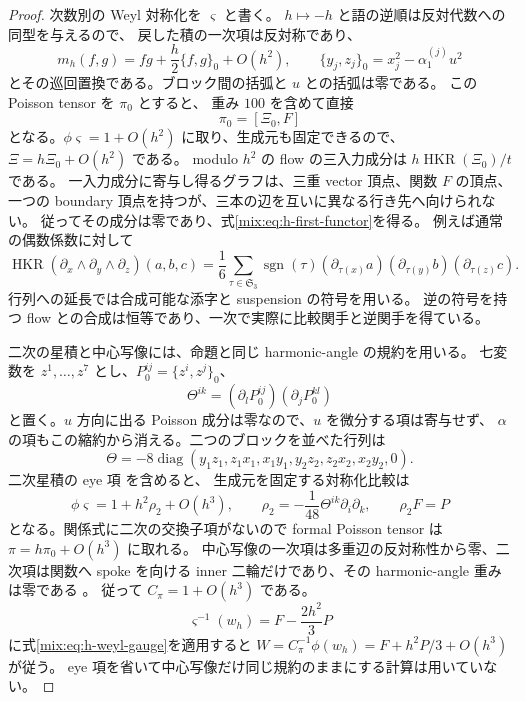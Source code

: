 \begin{proof}
次数別の Weyl 対称化を $\varsigma$ と書く。
$h\mapsto-h$ と語の逆順は反対代数への同型を与えるので、
戻した積の一次項は反対称であり、
\[
 m_h(f,g)=fg+\frac h2\{f,g\}_0+O(h^2),\qquad
 \{y_j,z_j\}_0=x_j^2-\alpha^{(j)}_1u^2
\]
とその巡回置換である。ブロック間の括弧と $u$ との括弧は零である。
この Poisson tensor を $\pi_0$ とすると、
重み $100$ を含めて直接
\[
 \pi_0=[\Xi_0,F]
\]
となる。$\phi\varsigma=1+O(h^2)$ に取り、生成元も固定できるので、
$\Xi=h\Xi_0+O(h^2)$ である。
modulo $h^2$ の flow の三入力成分は
$h\operatorname{HKR}(\Xi_0)/t$ である。
一入力成分に寄与し得るグラフは、三重 vector 頂点、関数 $F$ の頂点、
一つの boundary 頂点を持つが、三本の辺を互いに異なる行き先へ向けられない。
従ってその成分は零であり、式\eqref{mix:eq:h-first-functor}を得る。
例えば通常の偶数係数に対して
\[
 \operatorname{HKR}(\partial_x\wedge\partial_y\wedge\partial_z)(a,b,c)
 =\frac16\sum_{\tau\in\mathfrak S_3}\operatorname{sgn}(\tau)
       (\partial_{\tau(x)}a)(\partial_{\tau(y)}b)(\partial_{\tau(z)}c).
\]
行列への延長では合成可能な添字と suspension の符号を用いる。
逆の符号を持つ flow との合成は恒等であり、一次で実際に比較関手と逆関手を得ている。

二次の星積と中心写像には、命題と同じ
harmonic-angle の規約を用いる。
七変数を $z^1,\ldots,z^7$ とし、$P_0^{ij}=\{z^i,z^j\}_0$、
\[
 \Theta^{ik}=(\partial_lP_0^{ij})(\partial_jP_0^{kl})
\]
と置く。$u$ 方向に出る Poisson 成分は零なので、$u$ を微分する項は寄与せず、
$\alpha$ の項もこの縮約から消える。二つのブロックを並べた行列は
\begin{equation}\label{mix:eq:h-theta}
 \Theta=-8\operatorname{diag}
  (y_1z_1,z_1x_1,x_1y_1,y_2z_2,z_2x_2,x_2y_2,0).
\end{equation}
二次星積の eye 項
\cite[Section~2, equation~(3)]{GRDito}を含めると、
生成元を固定する対称化比較は
\begin{equation}\label{mix:eq:h-weyl-gauge}
 \phi\varsigma=1+h^2\rho_2+O(h^3),\qquad
 \rho_2=-\frac1{48}\Theta^{ik}\partial_i\partial_k,
 \qquad \rho_2F=P
\end{equation}
となる。関係式に二次の交換子項がないので formal Poisson tensor は
$\pi=h\pi_0+O(h^3)$ に取れる。
中心写像の一次項は多重辺の反対称性から零、二次項は関数へ spoke を向ける
inner 二輪だけであり、その harmonic-angle 重みは零である
\cite[Section~1.3, Theorem]{GRShoikhet}。
従って $C_\pi=1+O(h^3)$ である。
\[
 \varsigma^{-1}(w_h)=F-\frac{2h^2}{3}P
\]
に式\eqref{mix:eq:h-weyl-gauge}を適用すると
$W=C_\pi^{-1}\phi(w_h)=F+h^2P/3+O(h^3)$ が従う。
eye 項を省いて中心写像だけ同じ規約のままにする計算は用いていない。


\end{proof}
